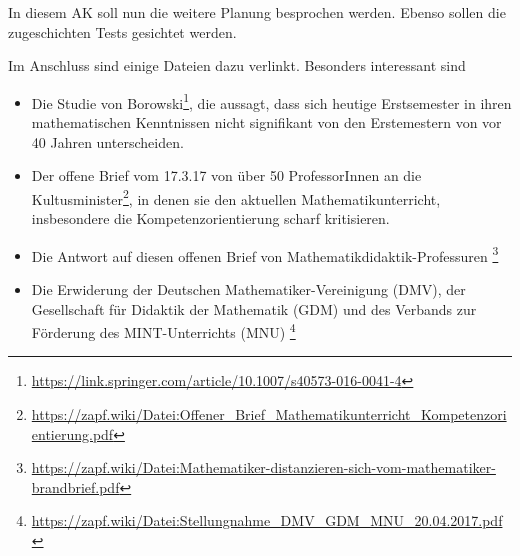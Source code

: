 In diesem AK soll nun die weitere Planung besprochen werden. Ebenso sollen die zugeschichten Tests gesichtet werden.

Im Anschluss sind einige Dateien dazu verlinkt. Besonders interessant sind

\begin{itemize}
\item Die Studie von Borowski\footnote{\url{https://link.springer.com/article/10.1007/s40573-016-0041-4}}, die aussagt, dass sich heutige Erstsemester in ihren mathematischen Kenntnissen nicht signifikant von den Erstemestern von vor 40 Jahren unterscheiden.
\item Der offene Brief vom 17.3.17 von über 50 ProfessorInnen an die Kultusminister\footnote{\url{https://zapf.wiki/Datei:Offener_Brief_Mathematikunterricht_Kompetenzorientierung.pdf}}, in denen sie den aktuellen Mathematikunterricht, insbesondere die Kompetenzorientierung scharf kritisieren.
\item Die Antwort auf diesen offenen Brief von Mathematikdidaktik-Professuren \footnote{\url{https://zapf.wiki/Datei:Mathematiker-distanzieren-sich-vom-mathematiker-brandbrief.pdf}}
\item Die Erwiderung der Deutschen Mathematiker-Vereinigung (DMV), der Gesellschaft für Didaktik der Mathematik (GDM) und des Verbands zur Förderung des MINT-Unterrichts (MNU) \footnote{\url{https://zapf.wiki/Datei:Stellungnahme_DMV_GDM_MNU_20.04.2017.pdf}}
\end{itemize}

